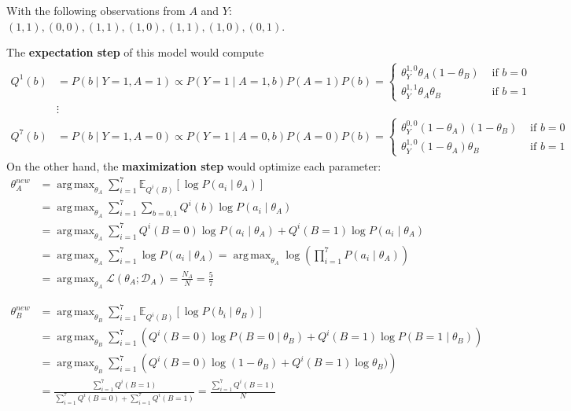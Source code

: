 \documentclass[11pt]{article}
\theoremstyle{definition}
\DeclareMathOperator*{\argmax}{arg\,max} %
\begin{document}
With the following observations from \( A \) and \( Y \): \( (1,1), (0,0), (1,1), (1,0), (1,1), (1,0), (0,1) \).

The \textbf{expectation step} of this model would compute
\[
  \begin{aligned}
  Q^{1}(b) &= P(b \mid Y=1, A=1) \propto P(Y=1 \mid A=1, b)P(A=1)P(b) = \begin{cases}
    \theta_{Y}^{1,0}\theta_{A}(1-\theta_{B}) &\text{ if } b = 0\\
    \theta_{Y}^{1,1}\theta_{A}\theta_{B} &\text{ if } b = 1
  \end{cases}\\
  &\vdots\\
   Q^{7}(b) &= P(b \mid Y=1, A=0) \propto P(Y=1 \mid A=0, b)P(A=0)P(b) = \begin{cases}
    \theta_{Y}^{0,0}(1-\theta_{A})(1-\theta_{B}) &\text{ if } b = 0\\
    \theta_{Y}^{1,0}(1-\theta_{A})\theta_{B} &\text{ if } b = 1
  \end{cases}
\end{aligned}
\]
On the other hand, the \textbf{maximization step} would optimize each parameter:
\[
  \begin{aligned}
    \theta_{A}^{new} &= \argmax_{\theta_{A}} \sum_{i=1}^{7}\mathbb{E}_{Q^{i}(B)}[\log P(a_{i} \mid \theta_{A})]\\
    &= \argmax_{\theta_{A}} \sum_{i=1}^{7} \sum_{b=0,1} Q^{i}(b) \log P(a_{i} \mid \theta_{A})\\
    &= \argmax_{\theta_{A}} \sum_{i=1}^{7} Q^{i}(B = 0) \log P(a_{i} \mid \theta_{A}) +  Q^{i}(B = 1) \log P(a_{i} \mid \theta_{A}) \\
    &= \argmax_{\theta_{A}} \sum_{i=1}^{7} \log P(a_{i} \mid \theta_{A}) = \argmax_{\theta_{A}} \log \left(\prod_{i=1}^{7}P(a_{i} \mid \theta_{A})\right)\\
    &= \argmax_{\theta_{A}} \mathcal{L}(\theta_{A}; \mathcal{D}_{A}) = \frac{N_{A}}{N} = \frac{5}{7}
    \end{aligned}
\]


\[
  \begin{aligned}
    \theta_{B}^{new} &= \argmax_{\theta_{B}} \sum_{i=1}^{7}\mathbb{E}_{Q^{i}(B)}[\log P(b_{i} \mid \theta_{B})]\\
    &= \argmax_{\theta_{B}} \sum_{i=1}^{7} \left( Q^{i}(B = 0)\log P(B=0 \mid \theta_{B}) + Q^{i}(B = 1)\log P(B=1 \mid \theta_{B})  \right)\\
    &=  \argmax_{\theta_{B}} \sum_{i=1}^{7} \left( Q^{i}(B = 0)\log (1-\theta_{B}) + Q^{i}(B = 1)\log \theta_{B})  \right)\\
    &= \frac{\sum_{i=1}^{7} Q^{i}(B = 1)}{\sum_{i=1}^{7} Q^{i}(B = 0) + \sum_{i=1}^{7} Q^{i}(B = 1) } =  \frac{\sum_{i=1}^{7} Q^{i}(B = 1)}{N}
    \end{aligned}
\]
\end{document}
